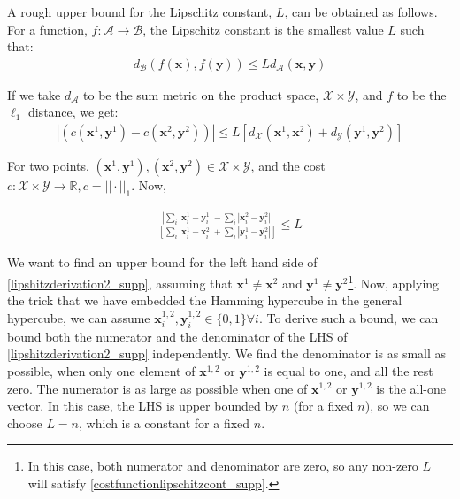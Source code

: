  
 
\noindent A rough upper bound for the Lipschitz constant, $L$, can be obtained as follows. For a function, $f:\mathcal{A}\rightarrow\mathcal{B}$, the Lipschitz constant is the smallest value $L$ such that:
\begin{align}
    d_{\mathcal{B}}(f(\mathbf{x}),f(\mathbf{y})) \leq L d_{\mathcal{A}}(\mathbf{x}, \mathbf{y}) \label{lipschitzcontinuous_supp}
\end{align}


If we take $d_{\mathcal{A}}$ to be the sum metric on the product space, $\mathcal{X}\times\mathcal{Y}$, and $f$ to be the $\ell_1$ distance, we get:
\begin{align}
    |(c(\mathbf{x}^1, \mathbf{y}^1) - c(\mathbf{x}^2, \mathbf{y}^2))| \leq L \left[d_{\mathcal{X}}(\mathbf{x}^1, \mathbf{x}^2)+ d_{\mathcal{Y}}(\mathbf{y}^1, \mathbf{y}^2)\right] \label{costfunctionlipschitzcont_supp}
\end{align}



\noindent For two points, $(\mathbf{x}^1, \mathbf{y}^1), (\mathbf{x}^2, \mathbf{y}^2) \in \mathcal{X}\times \mathcal{Y}$, and the cost $c:\mathcal{X}\times\mathcal{Y}\rightarrow \mathbb{R}, c = ||\cdot||_1$.
Now, 

\begin{align}
    \frac{\left|\sum_i |\mathbf{x}_i^1 - \mathbf{y}_i^1| - \sum_i |\mathbf{x}_i^2 - \mathbf{y}_i^2| \right|}{\left[\sum_i |\mathbf{x}_i^1 - \mathbf{x}_i^2| + \sum_i |\mathbf{y}_i^1 - \mathbf{y}_i^2| \right]} \leq L \label{lipshitzderivation2_supp}
\end{align}


\noindent We want to find an upper bound for the left hand side of \eqref{lipshitzderivation2_supp}, assuming that $\mathbf{x}^1 \neq \mathbf{x}^2$ and $\mathbf{y}^1 \neq \mathbf{y}^2$\footnote{In this case, both numerator and denominator are zero, so any non-zero $L$ will satisfy \eqref{costfunctionlipschitzcont_supp}.}. Now, applying the trick that we have embedded the Hamming hypercube in the general hypercube, we can assume $\mathbf{x}^{1,2}_i, \mathbf{y}^{1,2}_i \in \{0, 1\}\forall i$. To derive such a bound, we can bound both the numerator and the denominator of the LHS of \eqref{lipshitzderivation2_supp} independently. We find the denominator is as small as possible, when only one element of $\mathbf{x}^{1,2}$ or $\mathbf{y}^{1,2}$ is equal to one, and all the rest zero.  The numerator is as large as possible when one of $\mathbf{x}^{1,2}$ or $\mathbf{y}^{1,2}$ is the all-one vector. In this case, the LHS is upper bounded by $n$ (for a fixed $n$), so we can choose $L = n$, which is a constant for a fixed $n$.

